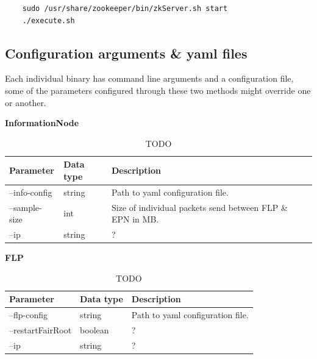 \documentclass[]{article}
\begin{document}
\begin{verbatim}
	sudo /usr/share/zookeeper/bin/zkServer.sh start
	./execute.sh
\end{verbatim}

\subsection{Configuration arguments \& yaml files}
Each individual binary has command line arguments and a configuration file, some of the parameters configured through these two methods might override one or another.

\begin{table}[H]
	\textbf{InformationNode}	
	\begin{center}	
		\begin{tabularx}{\textwidth}{ | l | l | X | }
			\hline
			\textbf{Parameter} & \textbf{Data type} & \textbf{Description} \\ \hline
					
			--info-config & string & Path to yaml configuration file. \\ \hline			
			--sample-size & int & Size of individual packets send between FLP \& EPN in MB. \\ \hline
			--ip & string & ? \\ \hline
		\end{tabularx}
		\caption{TODO}
		\label{tab:specs}
	\end{center}
\end{table}

\begin{table}[H]
	\textbf{FLP}	
	\begin{center}	
		\begin{tabularx}{\textwidth}{ | l | l | X | }
			\hline
			\textbf{Parameter} & \textbf{Data type} & \textbf{Description} \\ \hline	
					
			--flp-config & string & Path to yaml configuration file. \\ \hline			
			--restartFairRoot & boolean & ? \\ \hline
			--ip & string & ? \\ \hline
		\end{tabularx}
		\caption{TODO}
		\label{tab:specs}
	\end{center}
\end{table}
\end{document}
